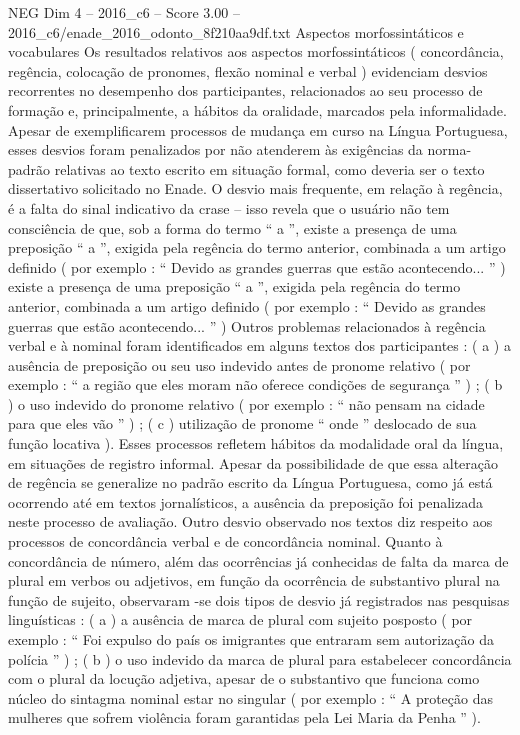 \begin{textsample}{NEG Dim 4 – 2016\_c6 – Score 3.00 – 2016\_c6/enade\_2016\_odonto\_8f210aa9df.txt}
Aspectos morfossintáticos e vocabulares Os resultados relativos aos aspectos morfossintáticos ( concordância, regência, colocação de pronomes, flexão nominal e verbal ) evidenciam desvios recorrentes no desempenho dos participantes, relacionados ao seu processo de formação e, principalmente, a hábitos da oralidade, marcados pela informalidade.
Apesar de exemplificarem processos de mudança em curso na Língua Portuguesa, esses desvios foram penalizados por não atenderem às exigências da norma-padrão relativas ao texto escrito em situação formal, como deveria ser o texto dissertativo solicitado no Enade.
O desvio mais frequente, em relação à regência, é a falta do sinal indicativo da crase – isso revela que o usuário não tem consciência de que, sob a forma do termo “ a ”, existe a presença de uma preposição “ a ”, exigida pela regência do termo anterior, combinada a um artigo definido ( por exemplo : “ Devido as grandes guerras que estão acontecendo... ” ) existe a presença de uma preposição “ a ”, exigida pela regência do termo anterior, combinada a um artigo definido ( por exemplo : “ Devido as grandes guerras que estão acontecendo... ” ) Outros problemas relacionados à regência verbal e à nominal foram identificados em alguns textos dos participantes : ( a ) a ausência de preposição ou seu uso indevido antes de pronome relativo ( por exemplo : “ a região que eles moram não oferece condições de segurança ” ) ; ( b ) o uso indevido do pronome relativo ( por exemplo : “ não pensam na cidade para que eles vão ” ) ; ( c ) utilização de pronome “ onde ” deslocado de sua função locativa ).
Esses processos refletem hábitos da modalidade oral da língua, em situações de registro informal.
Apesar da possibilidade de que essa alteração de regência se generalize no padrão escrito da Língua Portuguesa, como já está ocorrendo até em textos jornalísticos, a ausência da preposição foi penalizada neste processo de avaliação.
Outro desvio observado nos textos diz respeito aos processos de concordância verbal e de concordância nominal.
Quanto à concordância de número, além das ocorrências já conhecidas de falta da marca de plural em verbos ou adjetivos, em função da ocorrência de substantivo plural na função de sujeito, observaram -se dois tipos de desvio já registrados nas pesquisas linguísticas : ( a ) a ausência de marca de plural com sujeito posposto ( por exemplo : “ Foi expulso do país os imigrantes que entraram sem autorização da polícia ” ) ; ( b ) o uso indevido da marca de plural para estabelecer concordância com o plural da locução adjetiva, apesar de o substantivo que funciona como núcleo do sintagma nominal estar no singular ( por exemplo : “ A proteção das mulheres que sofrem violência foram garantidas pela Lei Maria da Penha ” ).

\end{textsample}
